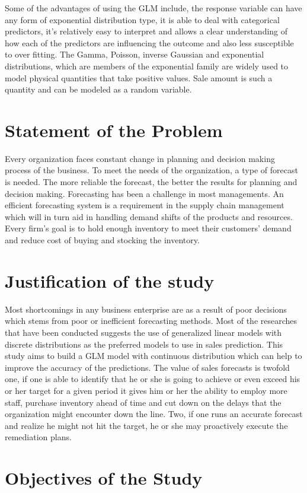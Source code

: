 Some of the advantages of using the GLM include, the response variable can have any form of exponential distribution type, it is able to deal with categorical predictors, it's relatively easy to interpret and allows a clear understanding of how each of the predictors are influencing the outcome and also less susceptible to over fitting. The Gamma, Poisson, inverse Gaussian and exponential distributions, which are members of the exponential family are widely used to model physical quantities that take positive values. Sale amount is such a quantity and can be modeled as a random variable. 
\section{Statement of the Problem}
Every organization faces constant change in planning and decision making process of the business. To meet the needs of the organization, a type of forecast is needed. The more reliable the forecast, the better the results for planning and decision making. Forecasting has been a challenge in most managements. An efficient forecasting system is a requirement in the supply chain management which will in turn aid in handling demand shifts of the products and resources. Every firm's goal is to hold enough inventory to meet their customers' demand and reduce cost of buying and stocking the inventory.

\section{Justification of the study}
Most shortcomings in any business enterprise are as a result of poor decisions which stems from poor or inefficient forecasting methods. Most of the researches that have been conducted suggests the use of generalized linear models with discrete distributions as the preferred models to use in sales prediction. This study aims to build a GLM model with continuous distribution which can help to improve the accuracy of the predictions. The value of sales forecasts is twofold one, if one is able to identify that he or she is going to achieve or even exceed his or her target for a given period it gives him or her the ability to employ more staff, purchase inventory ahead of time and cut down on the delays that the organization might encounter down the line. Two, if one runs an accurate forecast and realize he might not hit the target, he or she may proactively execute the remediation plans.
\section{Objectives of the Study}
